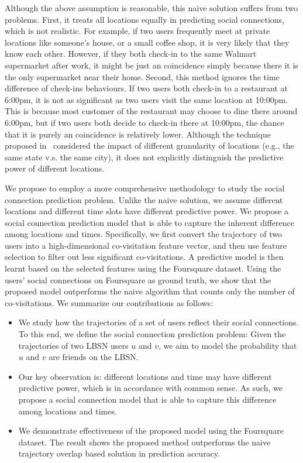 Although the above assumption is reasonable, this naive solution suffers from two problems. First, it treats all locations equally in predicting social connections, which is not realistic. For example, if two users frequently meet at private locations like someone's house, or a small coffee shop, it is very likely that they know each other. However, if they both check-in to the same Walmart supermarket after work, it might be just an coincidence simply because there it is the only supermarket near their home. Second, this method ignores the time difference of check-ins behaviours. If two users both check-in to a restaurant at 6:00pm, it is not as significant as two users visit the same location at 10:00pm. This is because most customer of the restaurant may choose to dine there around 6:00pm, but if two users both decide to check-in there at 10:00pm, the chance that it is purely an coincidence is relatively lower. Although the technique proposed in~\cite{xiao2010finding} considered the impact of different granularity of locations (e.g., the same state v.s. the same city), it does not explicitly distinguish the predictive power of different locations.

We propose to employ a more comprehensive methodology to study the social connection prediction problem. Unlike the naive solution, we assume different locations and different time slots have different predictive power. We propose a social connection prediction model that is able to capture the inherent difference among locations and times. Specifically, we first convert the trajectory of two users into a high-dimensional co-visitation feature vector, and then use feature selection to filter out less significant co-visitations. A predictive model is then learnt based on the selected features using the Foursquare dataset. Using the users' social connections on Foursquare as ground truth, we show that the proposed model outperforms the naive algorithm that counts only the number of co-visitations. We summarize our contributions as follows:
\begin{itemize}

\item We study how the trajectories of a set of users reflect their social connections. To this end, we define the social connection prediction problem: Given the trajectories of two LBSN users $u$ and $v$, we aim to model the probability that $u$ and $v$ are friends on the LBSN.

\item Our key observation is: different locations and time may have different predictive power, which is in accordance with common sense. As such, we propose a social connection model that is able to capture this difference among locations and times. 

\item We demonstrate effectiveness of the proposed model using the Foursquare dataset. The result shows the proposed method outperforms the naive trajectory overlap based solution in prediction accuracy.

\end{itemize} 

